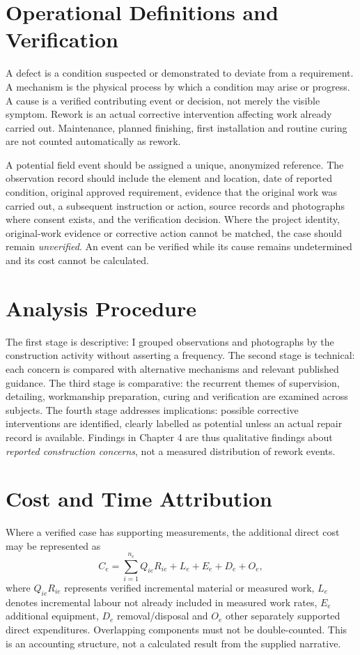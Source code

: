\section{Operational Definitions and Verification}
A defect is a condition suspected or demonstrated to deviate from a requirement. A mechanism is the physical process by which a condition may arise or progress. A cause is a verified contributing event or decision, not merely the visible symptom. Rework is an actual corrective intervention affecting work already carried out. Maintenance, planned finishing, first installation and routine curing are not counted automatically as rework.

A potential field event should be assigned a unique, anonymized reference. The observation record should include the element and location, date of reported condition, original approved requirement, evidence that the original work was carried out, a subsequent instruction or action, source records and photographs where consent exists, and the verification decision. Where the project identity, original-work evidence or corrective action cannot be matched, the case should remain \emph{unverified}. An event can be verified while its cause remains undetermined and its cost cannot be calculated.

\section{Analysis Procedure}
The first stage is descriptive: I grouped observations and photographs by the construction activity without asserting a frequency. The second stage is technical: each concern is compared with alternative mechanisms and relevant published guidance. The third stage is comparative: the recurrent themes of supervision, detailing, workmanship preparation, curing and verification are examined across subjects. The fourth stage addresses implications: possible corrective interventions are identified, clearly labelled as potential unless an actual repair record is available. Findings in Chapter 4 are thus qualitative findings about \emph{reported construction concerns}, not a measured distribution of rework events.

\section{Cost and Time Attribution}
Where a verified case has supporting measurements, the additional direct cost may be represented as
\begin{equation}
C_{e}=\sum_{i=1}^{n_e}Q_{ie}R_{ie}+L_{e}+E_{e}+D_{e}+O_{e},
\end{equation}
where $Q_{ie}R_{ie}$ represents verified incremental material or measured work, $L_e$ denotes incremental labour not already included in measured work rates, $E_e$ additional equipment, $D_e$ removal/disposal and $O_e$ other separately supported direct expenditures. Overlapping components must not be double-counted. This is an accounting structure, not a calculated result from the supplied narrative.

